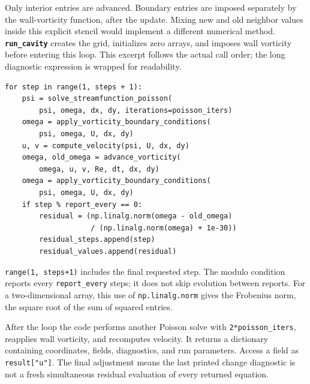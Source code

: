 Only interior entries are advanced. Boundary entries are imposed separately by the wall-vorticity function, after the update. Mixing new and old neighbor values inside this explicit stencil would implement a different numerical method.
\newpage
{}
\textbf{\texttt{run\_cavity}} creates the grid, initializes zero arrays, and imposes wall vorticity before entering this loop. This excerpt follows the actual call order; the long diagnostic expression is wrapped for readability.
\begin{lstlisting}
for step in range(1, steps + 1):
    psi = solve_streamfunction_poisson(
        psi, omega, dx, dy, iterations=poisson_iters)
    omega = apply_vorticity_boundary_conditions(
        psi, omega, U, dx, dy)
    u, v = compute_velocity(psi, U, dx, dy)
    omega, old_omega = advance_vorticity(
        omega, u, v, Re, dt, dx, dy)
    omega = apply_vorticity_boundary_conditions(
        psi, omega, U, dx, dy)
    if step % report_every == 0:
        residual = (np.linalg.norm(omega - old_omega)
                    / (np.linalg.norm(omega) + 1e-30))
        residual_steps.append(step)
        residual_values.append(residual)
\end{lstlisting}
\texttt{range(1, steps+1)} includes the final requested step. The modulo condition reports every \texttt{report\_every} steps; it does not skip evolution between reports. For a two-dimensional array, this use of \texttt{np.linalg.norm} gives the Frobenius norm, the square root of the sum of squared entries.

After the loop the code performs another Poisson solve with \texttt{2*poisson\_iters}, reapplies wall vorticity, and recomputes velocity. It returns a dictionary containing coordinates, fields, diagnostics, and run parameters. Access a field as \texttt{result["u"]}. The final adjustment means the last printed change diagnostic is not a fresh simultaneous residual evaluation of every returned equation.

